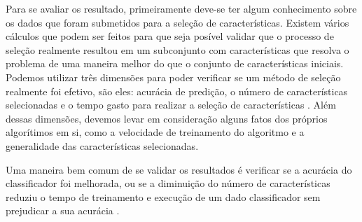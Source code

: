 Para se avaliar os resultado, primeiramente deve-se ter algum conhecimento sobre os dados que foram submetidos para a seleção de características. Existem vários cálculos que podem ser feitos para que seja posível validar que o processo de seleção realmente resultou em um subconjunto com características que resolva o problema de uma maneira melhor do que o conjunto de características iniciais. Podemos utilizar três dimensões para poder verificar se um método de seleção realmente foi efetivo, são eles: acurácia de predição, o número de características selecionadas e o tempo gasto para realizar a seleção de características \cite{huan_1998}. Além dessas dimensões, devemos levar em consideração alguns fatos dos próprios algorítimos em si, como a velocidade de treinamento do algoritmo e a generalidade das características selecionadas. 

Uma maneira bem comum de se validar os resultados é verificar se a acurácia do classificador foi melhorada, ou se a diminuição do número de características reduziu o tempo de treinamento e execução de um dado classificador sem prejudicar a sua acurácia \cite{liu_2005}.

